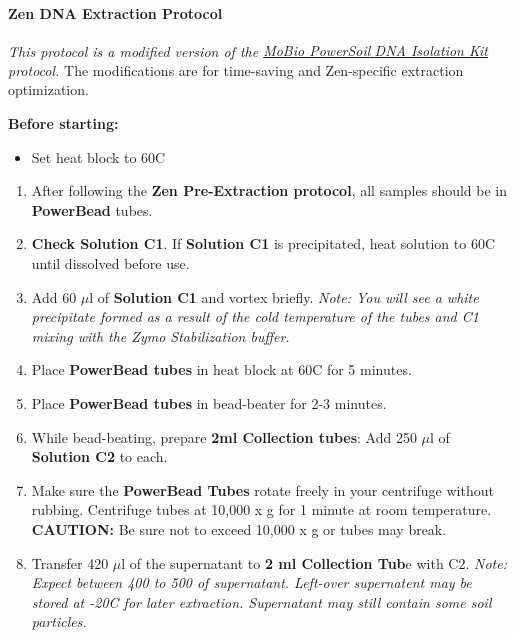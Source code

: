 \documentclass[11pt]{article}
\begin{document}
\begin{center}
\textbf{\large{Zen DNA Extraction Protocol}}
\break

\emph{This protocol is a modified version of the \href{http://www.mobio.com/images/custom/file/protocol/12888.pdf}{MoBio PowerSoil\textsuperscript{\tiny{ \textregistered   }}DNA Isolation Kit} protocol.} The modifications are for time-saving and Zen-specific extraction optimization.
\end{center}

\textbf{Before starting:} 
\begin{itemize}
\item
Set heat block to 60\degree C
\end{itemize}
\hfill
\hfill
\begin{enumerate}
\item
After following the \textbf{Zen Pre-Extraction protocol}, all samples should be in \textbf{PowerBead} tubes.

\item 
\textbf{Check Solution C1}. If \textbf{Solution C1} is precipitated, heat solution to 60\degree C until dissolved before use.

\item
Add 60 $\mu$l of \textbf{Solution C1} and vortex briefly. \emph{Note: You will see a white precipitate formed as a result of the cold temperature of the tubes and C1 mixing with the Zymo Stabilization buffer.}


\item
Place \textbf{PowerBead tubes} in heat block at 60\degree C for 5 minutes.

\item 
Place \textbf{PowerBead tubes} in bead-beater for 2-3 minutes.

\item
While bead-beating, prepare \textbf{2ml Collection tubes}: Add 250 $\mu$l of \textbf{Solution C2} to each.

\item
Make sure the \textbf{PowerBead Tubes} rotate freely in your centrifuge without rubbing. Centrifuge tubes at 10,000 x g for 1 minute at room temperature. \textbf{CAUTION:} Be sure not to exceed 10,000 x g or tubes may break.

\item 
Transfer 420 $\mu$l of the supernatant to \textbf{2 ml Collection Tub}e with C2.
\emph {Note: Expect between 400 to 500 of supernatant. Left-over supernatent may be stored at -20\degree C for later extraction. Supernatant may still contain some soil particles.}


\end{enumerate}
\end{document}
